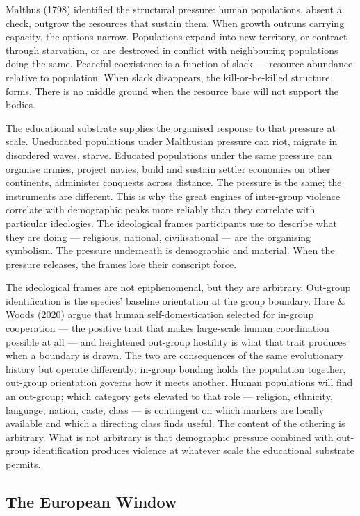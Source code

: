 \documentclass[12pt,letterpaper]{article}
\begin{document}
Malthus (1798) identified the structural pressure: human populations,
absent a check, outgrow the resources that sustain them. When growth
outruns carrying capacity, the options narrow. Populations expand into
new territory, or contract through starvation, or are destroyed in
conflict with neighbouring populations doing the same. Peaceful
coexistence is a function of slack --- resource abundance relative to
population. When slack disappears, the kill-or-be-killed structure
forms. There is no middle ground when the resource base will not
support the bodies.

The educational substrate supplies the organised response to that
pressure at scale. Uneducated populations under Malthusian pressure can
riot, migrate in disordered waves, starve. Educated populations under
the same pressure can organise armies, project navies, build and
sustain settler economies on other continents, administer conquests
across distance. The pressure is the same; the instruments are
different. This is why the great engines of inter-group violence
correlate with demographic peaks more reliably than they correlate with
particular ideologies. The ideological frames participants use to
describe what they are doing --- religious, national, civilisational
--- are the organising symbolism. The pressure underneath is
demographic and material. When the pressure releases, the frames lose
their conscript force.

The ideological frames are not epiphenomenal, but they are arbitrary.
Out-group identification is the species' baseline orientation at the
group boundary. Hare \& Woods (2020) argue that human
self-domestication selected for in-group cooperation --- the positive
trait that makes large-scale human coordination possible at all ---
and heightened out-group hostility is what that trait produces when a
boundary is drawn. The two are consequences of the same evolutionary
history but operate differently: in-group bonding holds the population
together, out-group orientation governs how it meets another. Human
populations will find an out-group; which category gets elevated to
that role --- religion, ethnicity, language, nation, caste, class ---
is contingent on which markers are locally available and which a
directing class finds useful. The content of the othering is
arbitrary. What is not arbitrary is that demographic pressure combined
with out-group identification produces violence at whatever scale the
educational substrate permits.

\subsection{The European Window}\label{the-european-window}
\end{document}
